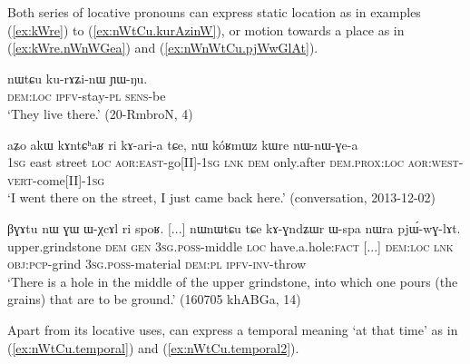 Both series of locative pronouns can express static location as in examples (\ref{ex:kWre}) to  (\ref{ex:nWtCu.kurAzinW}), or motion towards a place as in (\ref{ex:kWre.nWnWGea}) and (\ref{ex:nWnWtCu.pjWwGlAt}).

\begin{exe}
\ex \label{ex:nWtCu.kurAzinW}
 \gll nɯtɕu ku-rɤʑi-nɯ ɲɯ-ŋu. \\
 \textsc{dem}:\textsc{loc} \textsc{ipfv}-stay-\textsc{pl} \textsc{sens}-be \\
 \glt `They live there.' (20-RmbroN, 4)
\end{exe}

\begin{exe}
\ex \label{ex:kWre.nWnWGea}
 \gll aʑo akɯ kɤntɕʰaʁ ri kɤ-ari-a tɕe, nɯ kóʁmɯz kɯre nɯ-nɯ-ɣe-a \\
 \textsc{1sg} east street \textsc{loc} \textsc{aor}:\textsc{east}-go[II]-\textsc{1sg} \textsc{lnk} \textsc{dem} only.after \textsc{dem}.\textsc{prox}:\textsc{loc} \textsc{aor}:\textsc{west}-\textsc{vert}-come[II]-\textsc{1sg} \\
\glt `I went there on the street, I just came back here.' (conversation, 2013-12-02)
\end{exe}

\begin{exe}
\ex \label{ex:nWnWtCu.pjWwGlAt}
 \gll βɣɤtu nɯ ɣɯ ɯ-χcɤl ri spoʁ. [...] nɯnɯtɕu tɕe kɤ-ɣndʑɯr ɯ-spa nɯra pjɯ́-wɣ-lɤt. \\
upper.grindstone \textsc{dem} \textsc{gen} \textsc{3sg}.\textsc{poss}-middle \textsc{loc} have.a.hole:\textsc{fact}  [...] \textsc{dem}:\textsc{loc} \textsc{lnk} \textsc{obj}:\textsc{pcp}-grind \textsc{3sg}.\textsc{poss}-material \textsc{dem}:\textsc{pl} \textsc{ipfv}-\textsc{inv}-throw \\
\glt `There is a hole in the middle of the upper grindstone, into which one pours (the grains) that are to be ground.' (160705 khABGa, 14)
\end{exe}

Apart from its locative uses,  can express a temporal meaning `at that time' as in (\ref{ex:nWtCu.temporal}) and (\ref{ex:nWtCu.temporal2}).

